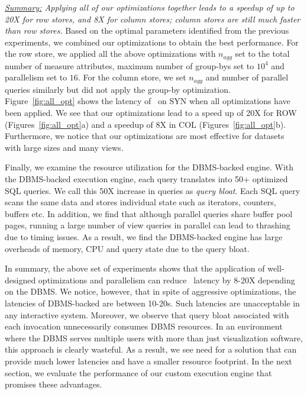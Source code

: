 {\em \underline{Summary:} Applying all of our optimizations together
leads to a speedup of up to 20X for row stores, and 8X for column stores;
column stores are still much faster than row stores.}
Based on the optimal parameters identified from the previous experiments, we combined 
our optimizations to obtain the best performance. 
For the row store, we applied all the above optimizations with $n_{agg}$ set to
the total number of measure attributes, maximum number of group-bys set to $10^4$ and
parallelism set to $16$.
For the column store, we set $n_{agg}$ and number of parallel queries similarly
but did not apply the group-by optimization. 
Figure~\ref{fig:all_opt} shows the latency of \SeeDB\ on SYN when all
optimizations have been applied.
We see that our optimizations lead to a speed up of 20X for ROW 
(Figures~\ref{fig:all_opt}a) and a speedup of 8X in COL (Figures~\ref{fig:all_opt}b).
Furthermore, we notice that our optimizations are most effective for datasets with 
large sizes and many views.

Finally, we examine the resource utilization for the DBMS-backed engine.
With the DBMS-backed execution engine, each \SeeDB query translates into 50+ optimized SQL queries.
We call this 50X increase in queries as {\it query bloat}. 
Each SQL query scans the same data and stores individual state such as iterators, counters, buffers etc.
In addition, we find that although parallel queries share buffer pool pages, running a large number of view queries in
parallel can lead to thrashing due to timing issues.
As a result, we find the DBMS-backed engine has large overheads of memory, CPU and query state due to the query bloat.

In summary, the above set of experiments shows that the application of well-designed optimizations
and parallelism can reduce \SeeDB\ latency by 8-20X depending on the DBMS.
We notice, however, that in spite of aggressive optimizations, the latencies of DBMS-backed
\SeeDB are between 10-20s.
Such latencies are unacceptable in any interactive system.
Moreover, we observe that query bloat associated with each \SeeDB invocation unnecessarily consumes DBMS resources.
In an environment where the DBMS serves multiple users with more than just visualization
software, this approach is clearly wasteful. 
As a result, we see need for a solution that can provide much lower latencies 
and have a smaller resource footprint.
In the next section, we evaluate the performance of our custom execution engine that promises these advantages.